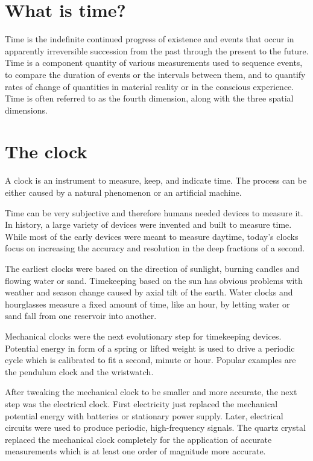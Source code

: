 \section{What is time?}

Time is the indefinite continued progress of existence and events that occur in apparently irreversible succession from the past through the present to the future.\cite{time_oxford}
Time is a component quantity of various measurements used to sequence events, to compare the duration of events or the intervals between them, and to quantify rates of change of quantities in material reality or in the conscious experience.\cite{time_merriam}
Time is often referred to as the fourth dimension, along with the three spatial dimensions.\cite{time_davies}

\section{The clock}

A clock is an instrument to measure, keep, and indicate time.\cite{clock_cambridge} The process can be either caused by a natural phenomenon or an artificial machine.

Time can be very subjective and therefore humans needed devices to measure it. In history, a large variety of devices were invented and built to measure time.\cite{clock_landes} While most of the early devices were meant to measure daytime, today's clocks focus on increasing the accuracy and resolution in the deep fractions of a second.

The earliest clocks were based on the direction of sunlight, burning candles and flowing water or sand. Timekeeping based on the sun has obvious problems with weather and season change caused by axial tilt of the earth. Water clocks and hourglasses measure a fixed amount of time, like an hour, by letting water or sand fall from one reservoir into another.

Mechanical clocks were the next evolutionary step for timekeeping devices. Potential energy in form of a spring or lifted weight is used to drive a periodic cycle which is calibrated to fit a second, minute or hour. Popular examples are the pendulum clock and the wristwatch.

After tweaking the mechanical clock to be smaller and more accurate, the next step was the electrical clock. First electricity just replaced the mechanical potential energy with batteries or stationary power supply. Later, electrical circuits were used to produce periodic, high-frequency signals. The quartz crystal replaced the mechanical clock completely for the application of accurate measurements which is at least one order of magnitude more accurate.

